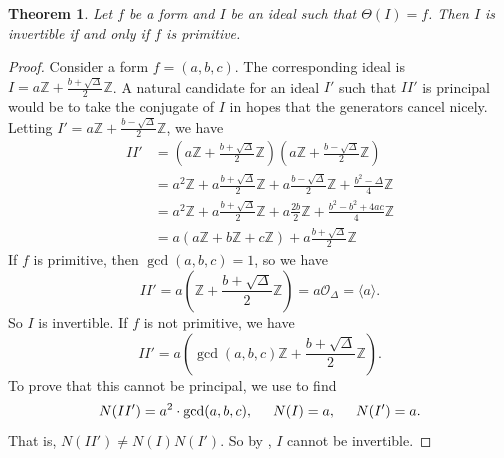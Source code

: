 \documentclass[honours,12pt]{unswthesis}
\newcommand{\Z}{\mathbb{Z}} %
\newcommand{\order}{\mathcal{O}} %
\newtheorem{theorem}{Theorem}[section]
\numberwithin{equation}{section}
\begin{document}
\begin{theorem} \label{thm-invertible-primitive}
    Let $f$ be a form and $I$ be an ideal such that $\Theta(I) = f$. Then $I$ is invertible if and only if $f$ is primitive.
\end{theorem}

\begin{proof}
    Consider a form $f = (a, b, c)$.
    The corresponding ideal is $I = a\Z + \frac{b + \sqrt\Delta}{2}\Z$.
    A natural candidate for an ideal $I'$ such that $II'$ is principal would be to take the conjugate of $I$ in hopes that the generators cancel nicely.
    Letting $I' = a\Z + \frac{b - \sqrt\Delta}{2}\Z$, we have
    \begin{align*}
        II' &= \left( a\Z + \frac{b + \sqrt\Delta}{2}\Z \right) \left( a\Z + \frac{b - \sqrt\Delta}{2}\Z \right) \\
        &= a^2\Z + a\frac{b + \sqrt\Delta}{2}\Z + a\frac{b - \sqrt\Delta}{2}\Z + \frac{b^2 - \Delta}{4}\Z \\
        &= a^2\Z + a\frac{b + \sqrt\Delta}{2}\Z + a\frac{2b}{2}\Z + \frac{b^2 - b^2 + 4ac}{4}\Z \\
        &= a(a\Z + b\Z + c\Z) + a\frac{b + \sqrt\Delta}{2}\Z
    \end{align*}
    If $f$ is primitive, then $\gcd(a, b, c) = 1$, so we have
    $$II' = a \left( \Z + \frac{b + \sqrt\Delta}{2}\Z \right) = a \order_\Delta = \langle a \rangle.$$
    So $I$ is invertible. If $f$ is not primitive, we have
    $$II' = a \left( \gcd(a, b, c) \Z + \frac{b + \sqrt\Delta}{2}\Z \right).$$
    To prove that this cannot be principal, we use  to find
    $$N(II') = a^2 \cdot \gcd(a, b, c), \hspace{5mm} N(I) = a, \hspace{5mm} N(I') = a.$$
    That is, $N(II') \neq N(I)N(I')$.
    So by , $I$ cannot be invertible.
\end{proof}
\end{document}

